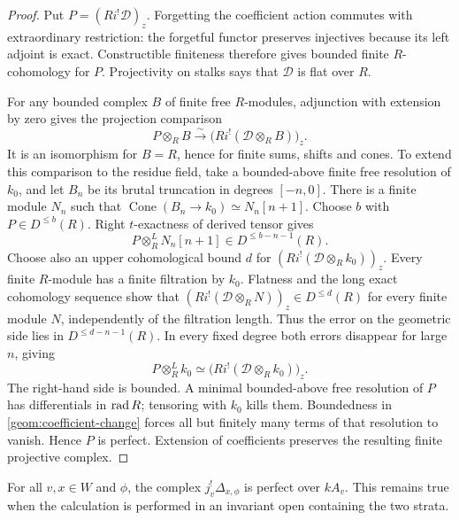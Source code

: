 \begin{proof}
Put \(P=(Ri^!\mathcal D)_z\). Forgetting the coefficient action commutes
with extraordinary restriction: the forgetful functor preserves
injectives because its left adjoint is exact. Constructible finiteness
therefore gives bounded finite \(R\)-cohomology for \(P\).
Projectivity on stalks says that \(\mathcal D\) is flat over \(R\).

For any bounded complex \(B\) of finite free \(R\)-modules, adjunction
with extension by zero gives the projection comparison
\[
 P\otimes_R B\xrightarrow{\sim}
 \bigl(Ri^!(\mathcal D\otimes_R B)\bigr)_z.
\]
It is an isomorphism for \(B=R\), hence for finite sums, shifts and
cones. To extend this comparison to the residue field, take a
bounded-above finite free resolution of \(k_0\), and let \(B_n\) be
its brutal truncation in degrees \([-n,0]\). There is a finite module
\(N_n\) such that
\(\operatorname{Cone}(B_n\to k_0)\simeq N_n[n+1]\).
Choose \(b\) with \(P\in D^{\le b}(R)\). Right \(t\)-exactness of
derived tensor gives
\[
 P\otimes_R^L N_n[n+1]\in D^{\le b-n-1}(R).
\]
Choose also an upper cohomological bound \(d\) for
\((Ri^!(\mathcal D\otimes_R k_0))_z\).
Every finite \(R\)-module has a finite filtration by \(k_0\).
Flatness and the long exact cohomology sequence show that
\((Ri^!(\mathcal D\otimes_R N))_z\in D^{\le d}(R)\)
for every finite module \(N\), independently of the filtration length.
Thus the error on the geometric side lies in
\(D^{\le d-n-1}(R)\). In every fixed degree both errors disappear for
large \(n\), giving
\begin{equation}\label{geom:coefficient-change}
 P\otimes_R^L k_0\simeq
 \bigl(Ri^!(\mathcal D\otimes_R k_0)\bigr)_z.
\end{equation}
The right-hand side is bounded. A minimal bounded-above free resolution
of \(P\) has differentials in \(\operatorname{rad} R\); tensoring with \(k_0\) kills
them. Boundedness in \eqref{geom:coefficient-change} forces all but
finitely many terms of that resolution to vanish. Hence \(P\) is
perfect. Extension of coefficients preserves the resulting finite
projective complex.
\end{proof}

\begin{lemma}\label{geom:cross-perfect}
For all \(v,x\in W\) and \(\phi\), the complex
\(j_v^!\Delta_{x,\phi}\) is perfect over \(kA_v\).
This remains true when the calculation is performed in an invariant
open containing the two strata.
\end{lemma}

